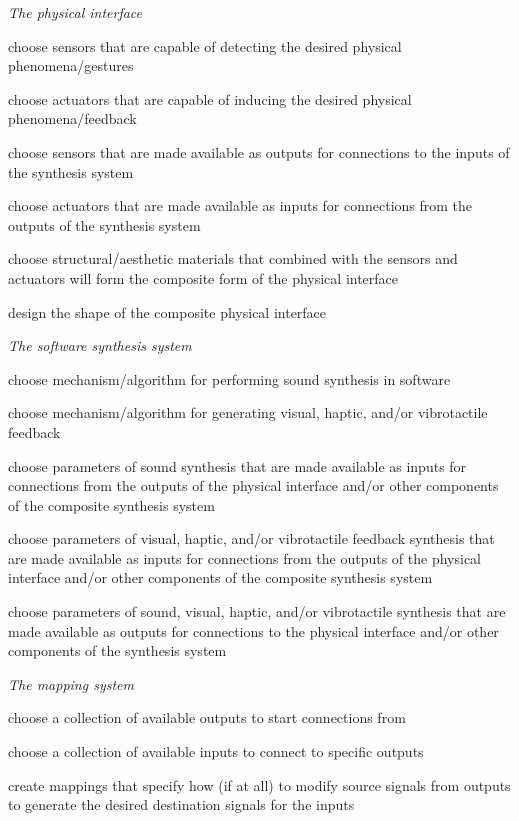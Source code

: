 \begin{description}
\item \emph{The physical interface}
\begin{description}
\item choose sensors that are capable of detecting the desired physical phenomena/gestures
\item choose actuators that are capable of inducing the desired physical phenomena/feedback
\item choose sensors that are made available as outputs for connections to the inputs of the synthesis system
\item choose actuators that are made available as inputs for connections from the outputs of the synthesis system
\item choose structural/aesthetic materials that combined with the sensors and actuators will form the composite form of the physical interface
\item design the shape of the composite physical interface
\end{description}
\item \emph{The software synthesis system}
\begin{description}
\item choose mechanism/algorithm for performing sound synthesis in software
\item choose mechanism/algorithm for generating visual, haptic, and/or vibrotactile feedback
\item choose parameters of sound synthesis that are made available as inputs for connections from the outputs of the physical interface and/or other components of the composite synthesis system
\item choose parameters of visual, haptic, and/or vibrotactile feedback synthesis that are made available as inputs for connections from the outputs of the physical interface and/or other components of the composite synthesis system
\item choose parameters of sound, visual, haptic, and/or vibrotactile synthesis that are made available as outputs for connections to the physical interface and/or other components of the synthesis system
\end{description}
\item \emph{The mapping system}
\begin{description}
	\item choose a collection of available outputs to start connections from
	\item choose a collection of available inputs to connect to specific outputs
	\item create mappings that specify how (if at all) to modify source signals from outputs to generate the desired destination signals for the inputs
\end{description}
\end{description}

